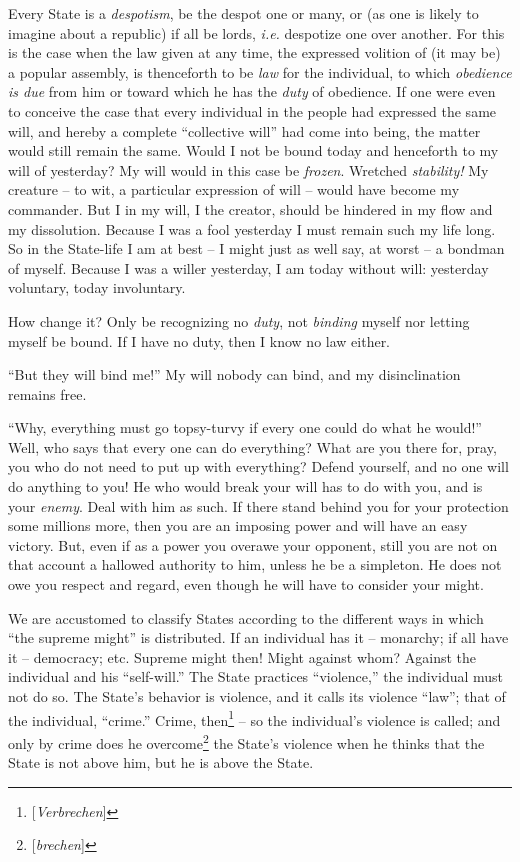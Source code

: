 Every State is a \textit{despotism}, be the despot one or many, or (as one is 
likely to imagine about a republic) if all be lords, \textit{i.e.} despotize 
one over another. For this is the case when the law given at any time, the 
expressed volition of (it may be) a popular assembly, is thenceforth to be 
\textit{law} for the individual, to which \textit{obedience is due} from him 
or toward which he has the \textit{duty} of obedience. If one were even to 
conceive the case that every individual in the people had expressed the same 
will, and hereby a complete ``collective will'' had come into being, the 
matter would still remain the same. Would I not be bound today and henceforth 
to my will of yesterday? My will would in this case be \textit{frozen}. 
Wretched \textit{stability!} My creature -- to wit, a particular expression of 
will -- would have become my commander. But I in my will, I the creator, 
should be hindered in my flow and my dissolution. Because I was a fool 
yesterday I must remain such my life long. So in the State-life I am at best 
-- I might just as well say, at worst -- a bondman of myself. Because I was a 
willer yesterday, I am today without will: yesterday voluntary, today 
involuntary.

How change it? Only be recognizing no \textit{duty}, not \textit{binding} 
myself nor letting myself be bound. If I have no duty, then I know no law 
either.

``But they will bind me!'' My will nobody can bind, and my disinclination 
remains free.

``Why, everything must go topsy-turvy if every one could do what he would!'' 
Well, who says that every one can do everything? What are you there for, pray, 
you who do not need to put up with everything? Defend yourself, and no one 
will do anything to you! He who would break your will has to do with you, and 
is your \textit{enemy}. Deal with him as such. If there stand behind you for 
your protection some millions more, then you are an imposing power and will 
have an easy victory. But, even if as a power you overawe your opponent, still 
you are not on that account a hallowed authority to him, unless he be a 
simpleton. He does not owe you respect and regard, even though he will have to 
consider your might.

We are accustomed to classify States according to the different ways in which 
``the supreme might'' is distributed. If an individual has it -- monarchy; 
if all have it -- democracy; etc. Supreme might then! Might against whom? 
Against the individual and his ``self-will.'' The State practices 
``violence,'' the individual must not do so. The State's behavior is 
violence, and it calls its violence ``law''; that of the individual, 
``crime.'' Crime, then\footnote{[\textit{Verbrechen}]} -- so the 
individual's violence is called; and only by crime does he 
overcome\footnote{[\textit{brechen}]} the State's violence when he thinks that 
the State is not above him, but he is above the State.

